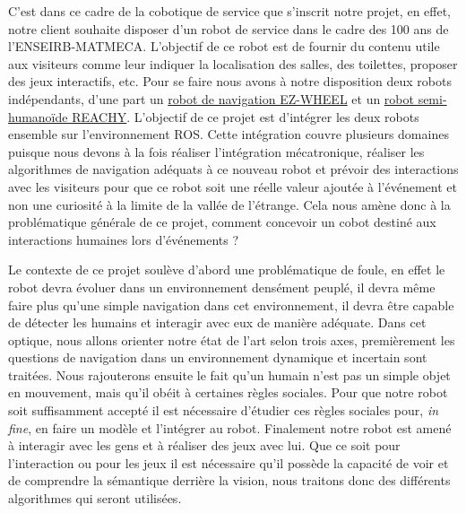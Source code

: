 C'est dans ce cadre de la cobotique de service que s'inscrit notre projet, en effet, notre client souhaite disposer d'un robot de service dans le cadre des 100 ans de l'ENSEIRB-MATMECA. L'objectif de ce robot est de fournir du contenu utile aux visiteurs comme leur indiquer la localisation des salles, des toilettes, proposer des jeux interactifs, etc. Pour se faire nous avons à notre disposition deux robots indépendants, d'une part un \href{https://ez-wheel.com/fr/kit-de-developpement-pour-agvamr}{robot de navigation EZ-WHEEL} et un \href{https://www.pollen-robotics.com/}{robot semi-humanoïde REACHY}. L'objectif de ce projet est d'intégrer les deux robots ensemble sur l'environnement ROS. Cette intégration couvre plusieurs domaines puisque nous devons à la fois réaliser l'intégration mécatronique, réaliser les algorithmes de navigation adéquats à ce nouveau robot et prévoir des interactions avec les visiteurs pour que ce robot soit une réelle valeur ajoutée à l'événement et non une curiosité à la limite de la vallée de l'étrange. Cela nous amène donc à la problématique générale de ce projet, comment concevoir un cobot destiné aux interactions humaines lors d'événements ?


Le contexte de ce projet soulève d'abord une problématique de foule, en effet le robot devra évoluer dans un environnement densément peuplé, il devra même faire plus qu'une simple navigation dans cet environnement, il devra être capable de détecter les humains et interagir avec eux de manière adéquate. Dans cet optique, nous allons orienter notre état de l'art selon trois axes, premièrement les questions de navigation dans un environnement dynamique et incertain sont traitées. Nous rajouterons ensuite le fait qu'un humain n'est pas un simple objet en mouvement, mais qu'il obéit à certaines règles sociales. Pour que notre robot soit suffisamment accepté il est nécessaire d'étudier ces règles sociales pour, \textit{in fine}, en faire un modèle et l'intégrer au robot. Finalement notre robot est amené à interagir avec les gens et à réaliser des jeux avec lui. Que ce soit pour l'interaction ou pour les jeux il est nécessaire qu'il possède la capacité de voir et de comprendre la sémantique derrière la vision, nous traitons donc des différents algorithmes qui seront utilisées.